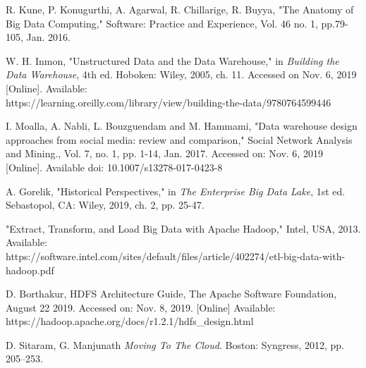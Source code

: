 \documentclass[journal]{IEEEtran}
\begin{document}
\begin{thebibliography}{1}

R. Kune, P. Konugurthi, A. Agarwal, R. Chillarige, R. Buyya,
 "The Anatomy of Big Data Computing," Software: Practice and Experience,
 Vol. 46 no. 1, pp.79-105, Jan. 2016. 

W. H. Inmon, "Unstructured Data and the Data Warehouse," in 
  \emph{Building the Data Warehouse},
  4th ed. Hoboken: Wiley, 2005, ch. 11.
  Accessed on Nov. 6, 2019 [Online]. 
  Available: \\ https://learning.oreilly.com/library/view/building-the-data/9780764599446

I. Moalla, A. Nabli, L. Bouzguendam and M. Hammami,
 "Data warehouse design approaches from social media: review and comparison,"
 Social Network Analysis and Mining., Vol. 7, no. 1, pp. 1-14, Jan. 2017.
 Accessed on: Nov. 6, 2019 [Online]. 
 Available doi: 10.1007/s13278-017-0423-8

A. Gorelik, "Historical Perspectives," in 
 \emph{The Enterprise Big Data Lake},
 1st ed. Sebastopol, CA: Wiley, 2019, ch. 2, pp. 25-47.

"Extract, Transform, and Load Big Data with Apache Hadoop," Intel, USA, 2013.
 Available:\\ https://software.intel.com/sites/default/files/article/402274/etl-big-data-with-hadoop.pdf

D. Borthakur, HDFS Architecture Guide, The Apache Software Foundation,
 August 22 2019. Accessed on: Nov. 8, 2019. [Online] Available: \\
 https://hadoop.apache.org/docs/r1.2.1/hdfs\_design.html

D. Sitaram, G. Manjunath \textit{Moving To The Cloud}. Boston: Syngress, 2012, pp. 205–253.


\end{thebibliography}


\end{document}
